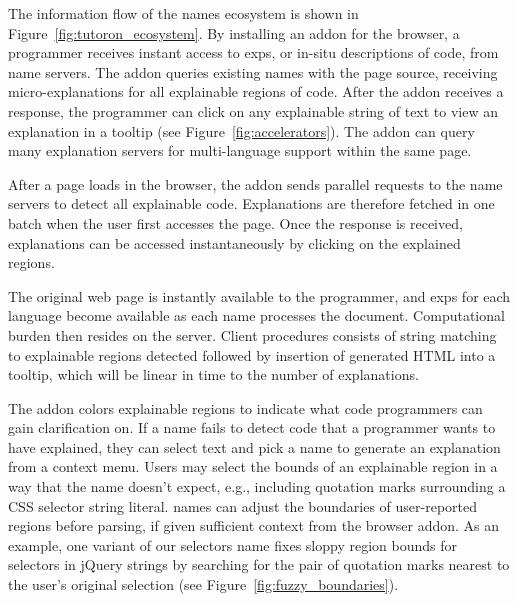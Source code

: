 The information flow of the \Glspl{name} ecosystem is shown in Figure~\ref{fig:tutoron_ecosystem}.
By installing an addon for the browser, a programmer receives instant access to \glspl{exp}, or in-situ descriptions of code, from \Gls{name} servers.
The addon queries existing \Glspl{name} with the page source, receiving micro-explanations for all explainable regions of code.
After the addon receives a response, the programmer can click on any explainable string of text to view an explanation in a tooltip (see Figure~\ref{fig:accelerators}).
The addon can query many explanation servers for multi-language support within the same page.


\begin{changes}
After a page loads in the browser, the addon sends parallel requests to the \Gls{name} servers to detect all explainable code.
Explanations are therefore fetched in one batch when the user first accesses the page.
Once the response is received, explanations can be accessed instantaneously by clicking on the explained regions.
\end{changes}
The original web page is instantly available to the programmer, and \glspl{exp} for each language become available as each \Gls{name} processes the document.
Computational burden then resides on the server.
 Client procedures consists of string matching to explainable regions detected followed by insertion of generated HTML into a tooltip, which will be linear in time to the number of explanations.\fi

\begin{changes}
The addon colors explainable regions to indicate what code programmers can gain clarification on.
If a \Gls{name} fails to detect code that a programmer wants to have explained, they can select text and pick a \Gls{name} to generate an explanation from a context menu.
Users may select the bounds of an explainable region in a way that the \Gls{name} doesn't expect, e.g., including quotation marks surrounding a CSS selector string literal.
\Glspl{name} can adjust the boundaries of user-reported regions before parsing, if given sufficient context from the browser addon.
As an example, one variant of our selectors \Gls{name} fixes sloppy region bounds for selectors in jQuery strings by searching for the pair of quotation marks nearest to the user's original selection (see Figure~\ref{fig:fuzzy_boundaries}).

\end{changes}
  \fi

